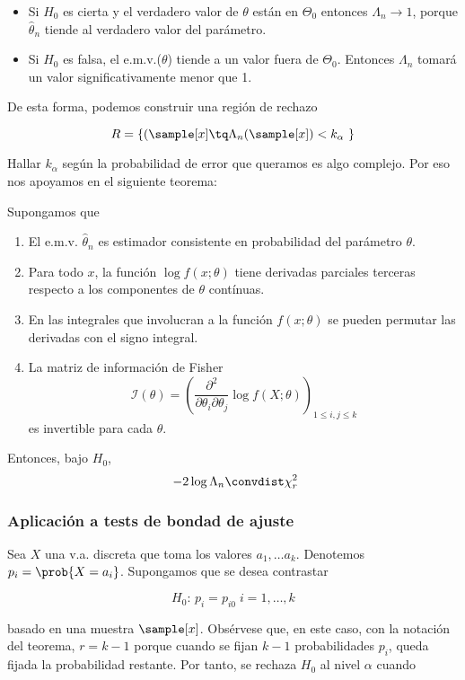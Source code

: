 \documentclass{apuntes}
\begin{document}
\begin{itemize}
\item Si $H_0$ es cierta y el verdadero valor de $\theta$ están en $\Theta_0$ entonces $\Lambda_n \to 1$, porque $\hat{\theta}_n$ tiende al verdadero valor del parámetro.
\item Si $H_0$ es falsa, el e.m.v.($\theta$) tiende a un valor fuera de $\Theta_0$. Entonces $\Lambda_n$ tomará un valor significativamente menor que 1.
\end{itemize}

De esta forma, podemos construir una región de rechazo

\[ R = \{(\sample[x]\tq \Lambda_n(\sample[x]) < k_\alpha \} \]

Hallar $k_\alpha$ según la probabilidad de error que queramos es algo complejo. Por eso nos apoyamos en el siguiente teorema:

\pagebreak[0]
\begin{theorem}
Supongamos que
\begin{enumerate}
\item El e.m.v. $\hat{\theta}_n$ es estimador consistente en probabilidad del parámetro $\theta$.
\item Para todo $x$, la función $\log f(x;\theta)$ tiene derivadas parciales terceras respecto a los componentes de $\theta$ contínuas.
\item En las integrales que involucran a la función $f(x;\theta)$ se pueden permutar las derivadas con el signo integral.
\item La matriz de información de Fisher \[ \mathcal{I}(\theta) = \left(\frac{\partial^2}{\partial\theta_i\partial\theta_j} \log f(X;\theta)\right)_{1\leq i,j\leq k} \] es invertible para cada $\theta$.
\end{enumerate}

Entonces, bajo $H_0$, \[ -2\log \Lambda_n \convdist \chi^2_r \]
\end{theorem}

\subsubsection{Aplicación a tests de bondad de ajuste}\label{bondadDeAjuste}
Sea $X$ una v.a. discreta que toma los valores $a_1,\dotsc a_k$. Denotemos $p_i = \prob{X=a_i}$. Supongamos que se desea contrastar

\[ H_0:\, p_i = p_{i0}\; i=1,\dots,k \]

basado en una muestra $\sample[x]$. Obsérvese que, en este caso, con la notación del teorema, $r = k - 1$ porque cuando se fijan $k - 1$ probabilidades $p_i$, queda fijada la probabilidad restante. Por tanto, se rechaza $H_0$ al nivel $\alpha$ cuando
\end{document}
